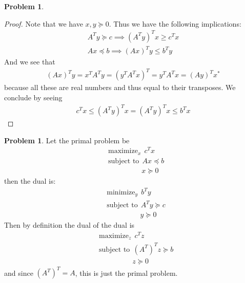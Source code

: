 \documentclass[letterpaper,12pt]{article}
\theoremstyle{definition}
\newtheorem{problem}[theorem]{Problem}
\begin{document}
\begin{problem}{8.15}
\begin{proof}
Note that we have $x, y \succeq 0$. Thus we have the following implications:
\begin{align*}
A^Ty \succeq c \implies (A^Ty)^Tx \geq c^Tx \\
Ax \preceq b \implies (Ax)^Ty \leq b^Ty 
\end{align*}
And we see that
\begin{align*}
(Ax)^Ty = x^TA^Ty = (y^TA^Tx)^T = y^TA^Tx = (Ay)^Tx^*
\end{align*}
because all these are real numbers and thus equal to their transposes. We conclude by seeing
\begin{align*}
c^Tx \leq (A^Ty)^Tx = (A^Ty)^Tx \leq b^Tx
\end{align*}
\end{proof}
\end{problem}

\begin{problem}{8.17}
Let the primal problem be   
\begin{align*}
&\text{maximize}_x \ \ c^Tx \\
  &\text{subject to} \ \ Ax \preceq b \\
  &\qquad \qquad \ \ \ x \succeq 0
\end{align*}
then the dual is:
\begin{align*}
&\text{minimize}_y \ \ b^Ty \\
  &\text{subject to} \ \ A^Ty \succeq c \\
  &\qquad \qquad \ \ \ y \succeq 0
\end{align*}
Then by definition the dual of the dual is
\begin{align*}
&\text{maximize}_z \ \ c^Tz \\
  &\text{subject to} \ \ (A^T)^Tz \succeq b \\
  &\qquad \qquad \ \ \ z \succeq 0
\end{align*}
and since $(A^T)^T = A$, this is just the primal problem.
\end{problem}
\end{document}
